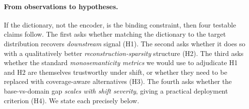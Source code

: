 \paragraph{From observations to hypotheses.}
If the dictionary, not the encoder, is the binding constraint, then four
testable claims follow. The first asks whether matching the dictionary
to the target distribution recovers \emph{downstream} signal (H1).
The second asks whether it does so with a qualitatively better
\emph{reconstruction-sparsity} structure (H2).  The third asks whether
the standard \emph{monosemanticity metrics} we would use to adjudicate
H1 and H2 are themselves trustworthy under shift, or whether they need
to be replaced with coverage-aware alternatives (H3).  The fourth asks
whether the base-vs-domain gap \emph{scales with shift severity},
giving a practical deployment criterion (H4).  We state each precisely
below.

